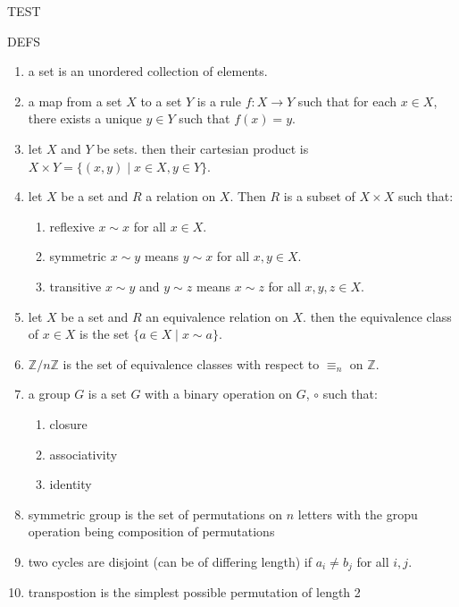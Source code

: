 

\begin{center}
	TEST
\end{center}
DEFS
\begin{enumerate}
	\item a set is an unordered collection of elements. 
	\item a map from a set $X$ to a set $Y$ is a rule $f: X \to Y$ such that for each $x \in X$, there exists a unique $y \in Y$ such that $f(x)=y$. 
	\item let $X$ and $Y$ be sets. then their cartesian product is $X \times Y = \{(x,y) \mid x \in X, y \in Y\}$. 
	\item let $X$ be a set and $R$ a relation on $X$. Then $R$ is a subset of $X \times X$ such that: 
	\begin{enumerate}
		\item reflexive $x \sim x$ for all $x \in X$. 
		\item symmetric $x \sim y$ means $y \sim x$ for all $x,y \in X$. 
		\item transitive $x \sim y$ and $y \sim z$ means $x \sim z$ for all $x,y,z \in X$. 
	\end{enumerate}
	\item let $X$ be a set and $R$ an equivalence relation on $X$. then the equivalence class of $x \in X$ is the set $\{a \in X \mid x \sim a\}$. 
	\item $\mathbb{Z}/n\mathbb{Z}$ is the set of equivalence classes with respect to $\equiv_n$ on $\mathbb{Z}$. 
	\item a group $G$ is a set $G$ with a binary operation on $G$, $\circ$ such that: 
	\begin{enumerate}
		\item closure
		\item associativity
		\item identity
		\inverses
	\end{enumerate}
	\item symmetric group is the set of permutations on $n$ letters with the gropu operation being composition of permutations
	\item two cycles are disjoint (can be of differing length) if $a_i \neq b_j$ for all $i,j$. 
	\item transpostion is the simplest possible permutation of length 2 
\end{enumerate}


